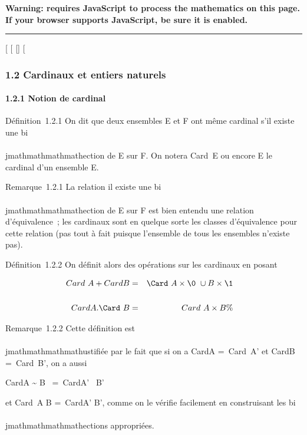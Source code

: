 \textbf{Warning: 
requires JavaScript to process the mathematics on this page.\\ If your
browser supports JavaScript, be sure it is enabled.}

\begin{center}\rule{3in}{0.4pt}\end{center}

{[}
{[}
{[}{]}
{[}

\subsubsection{1.2 Cardinaux et entiers naturels}

\paragraph{1.2.1 Notion de cardinal}

Définition~1.2.1 On dit que deux ensembles E et F ont même cardinal s'il
existe une bi\\\\jmathmathmathmathection de E sur F. On notera
Card~E ou encore \textbar{}E\textbar{} le
cardinal d'un ensemble E.

Remarque~1.2.1 La relation il existe une bi\\\\jmathmathmathmathection de E sur F est bien
entendu une relation d'équivalence~; les cardinaux sont en quelque sorte
les classes d'équivalence pour cette relation (pas tout à fait puisque
l'ensemble de tous les ensembles n'existe pas).

Définition~1.2.2 On définit alors des opérations sur les cardinaux en
posant

\begin{align*} Card~A
+ CardB& =& \Card~A
\times\0\ \cup B
\times\1\\%
\\
CardA.\Card~B& =&
Card~A \times B \%&
\\ \end{align*}

Remarque~1.2.2 Cette définition est \\\\jmathmathmathmathustifiée par le fait que si on a
CardA =\ Card~A' et
CardB =\ Card~B', on a
aussi

CardA \times\0\~ \cup
B \times\1\ =\
CardA' \times\0\ \cup B'
\times\1\

et Card~A \times B =\
CardA' \times B', comme on le vérifie facilement en construisant les
bi\\\\jmathmathmathmathections appropriées.

